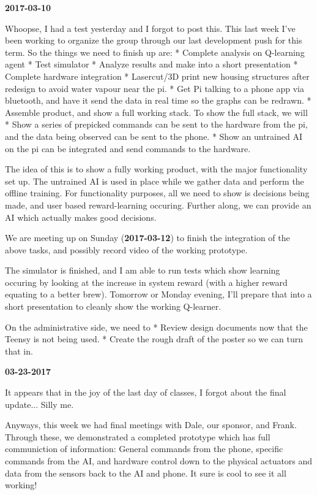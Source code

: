 \textbf{2017-03-10} 

Whoopse, I had a test yesterday and I forgot to post this. 
This last week I've been working to organize the group through our last development push for this term.
So the things we need to finish up are:
* Complete analysis on Q-learning agent
  * Test simulator
  * Analyze results and make into a short presentation
* Complete hardware integration
  * Lasercut/3D print new housing structures after redesign to avoid water vapour near the pi.
  * Get Pi talking to a phone app via bluetooth, and have it send the data in real time so the graphs can be redrawn.
  * Assemble product, and show a full working stack. To show the full stack, we will
     * Show a series of prepicked commands can be sent to the hardware from the pi, and the data being observed can be sent to the phone.
     * Show an untrained AI on the pi can be integrated and send commands to the hardware.
    
    The idea of this is to show a fully working product, with the major functionality set up. The untrained AI is used in place while we gather data and perform the offline training. For functionality purposes, all we need to show is decisions being made, and user based reward-learning occuring. Further along, we can provide an AI which actually makes good decisions.

We are meeting up on Sunday (\textbf{2017-03-12}) to finish the integration of the above tasks, and possibly record video of the working prototype.

The simulator is finished, and I am able to run tests which show learning occuring by looking at the increase in system reward (with a higher reward equating to a better brew). Tomorrow or Monday evening, I'll prepare that into a short presentation to cleanly show the working Q-learner.

On the administrative side, we need to
* Review design documents now that the Teensy is not being used.
* Create the rough draft of the poster so we can turn that in.

\textbf{03-23-2017}

It appears that in the joy of the last day of classes, I forgot about the final update... Silly me.

Anyways, this week we had final meetings with Dale, our sponsor, and Frank. Through these, we demonstrated a completed prototype which has full communiction of information: General commands from the phone, specific commands from the AI, and hardware control down to the physical actuators and data from the sensors back to the AI and phone. It sure is cool to see it all working!

